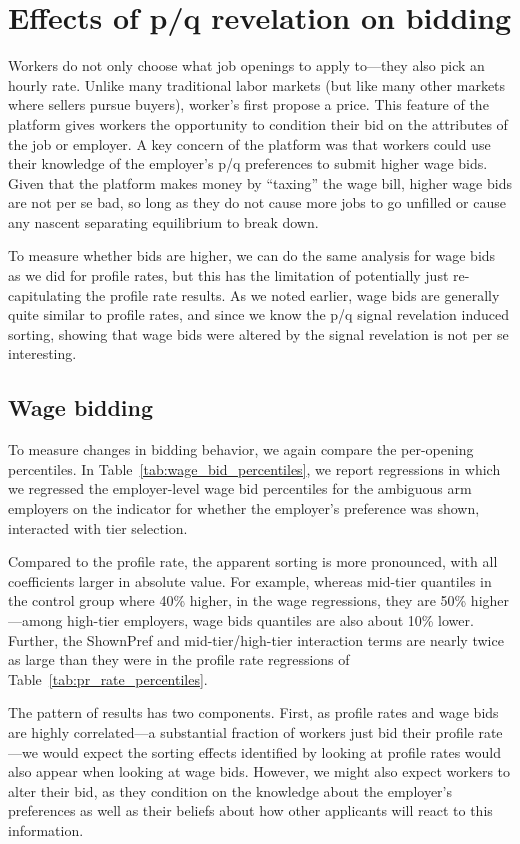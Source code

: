 \documentclass[prodmode,acmec]{ec-acmsmall}
\begin{document}
\section{Effects of p/q revelation on bidding} 
\label{sec:bidding}
Workers do not only choose what job openings to apply to---they also pick an hourly rate.
Unlike many traditional labor markets (but like many other markets where sellers pursue buyers), worker's first propose a price. 
This feature of the platform gives workers the opportunity to condition their bid on the attributes of the job or employer.
A key concern of the platform was that workers could use their knowledge of the employer's p/q preferences to submit higher wage bids.
Given that the platform makes money by ``taxing'' the wage bill, higher wage bids are not per se bad, so long as they do not cause more jobs to go unfilled or cause any nascent separating equilibrium to break down.

To measure whether bids are higher, we can do the same analysis for wage bids as we did for profile rates, but this has the limitation of potentially just re-capitulating the profile rate results.
As we noted earlier, wage bids are generally quite similar to profile rates, and since we know the p/q signal revelation induced sorting, showing that wage bids were altered by the signal revelation is not per se interesting.

\subsection{Wage bidding \label{sec:wage_bidding}}
To measure changes in bidding behavior, we again compare the per-opening percentiles.
In Table~\ref{tab:wage_bid_percentiles}, we report regressions in which we regressed the employer-level wage bid percentiles for the ambiguous arm employers on the indicator for whether the employer's preference was shown, interacted with tier selection.

Compared to the profile rate, the apparent sorting is more pronounced, with all coefficients larger in absolute value. 
For example, whereas mid-tier quantiles in the control group where 40\% higher, in the wage regressions, they are 50\% higher---among high-tier employers, wage bids quantiles are also about 10\% lower. 
Further, the ShownPref and mid-tier/high-tier interaction terms are nearly twice as large than they were in the profile rate regressions of Table~\ref{tab:pr_rate_percentiles}.  

The pattern of results has two components. 
First, as profile rates and wage bids are highly correlated---a substantial fraction of workers just bid their profile rate---we would expect the sorting effects identified by looking at profile rates would also appear when looking at wage bids. 
However, we might also expect workers to alter their bid, as they condition on the knowledge about the employer's preferences as well as their beliefs about how other applicants will react to this information. 
\end{document}
